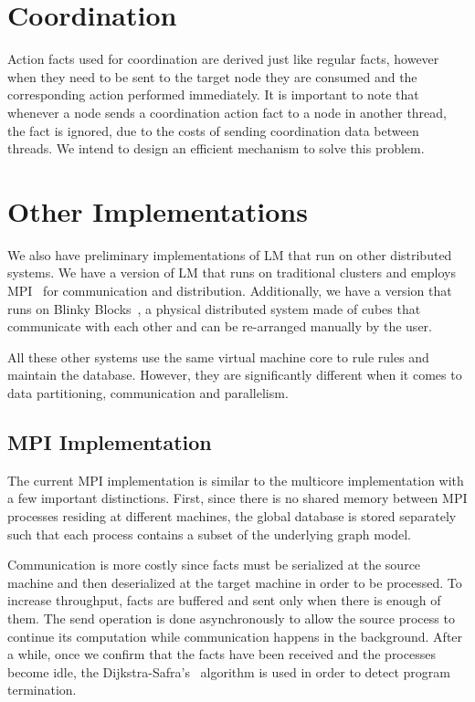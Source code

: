 \section{Coordination}

Action facts used for coordination are derived just like regular facts, however when they need to be sent to the target node
they are consumed and the corresponding action performed immediately.
It is important to note that whenever a node sends a coordination action fact to a node in another thread,
the fact is ignored, due to the costs of sending
coordination data between threads. We intend to design an efficient mechanism to solve this problem.

\section{Other Implementations}

We also have preliminary implementations of LM that run on other distributed systems.
We have a version of LM that runs on traditional clusters and employs MPI~\cite{gabriel04-open-mpi} for communication
and distribution. Additionally, we have a version that runs on Blinky Blocks~\cite{Kirby-chi11}, a physical distributed system
made of cubes that communicate with each other and can be re-arranged manually by the user.

All these other systems use the same virtual machine core to rule rules and maintain the database. However, they are significantly different
when it comes to data partitioning, communication and parallelism.

\subsection{MPI Implementation}

The current MPI implementation is similar to the multicore implementation with a few important distinctions. First, since there is no shared
memory between MPI processes residing at different machines, the global database is stored separately such that each process contains a subset
of the underlying graph model.

Communication is more costly since facts must be serialized at the source machine and then deserialized
at the target machine in order to be processed. To increase throughput, facts are buffered and sent only when there is enough of them.
The send operation is done asynchronously to allow the source process to continue its computation while communication happens in the background.
After a while, once we confirm that the facts have been received and the processes become idle, the Dijkstra-Safra's~\cite{safras87} algorithm
is used in order to detect program termination.

